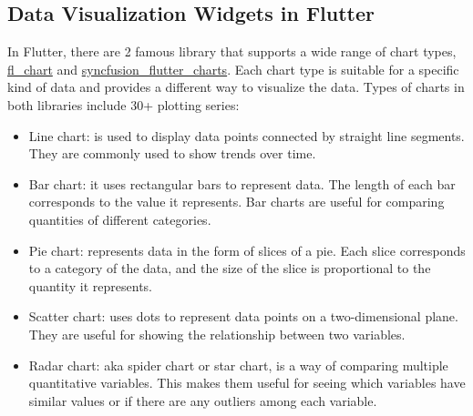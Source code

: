 \begin{multicols}{2}
      \subsection{Data Visualization Widgets in Flutter}
      In Flutter, there are 2 famous library that supports a wide range of chart types, \href{https://pub.dev/packages/fl_chart}{fl\_chart}
      and \href{https://pub.dev/packages/syncfusion_flutter_charts}{syncfusion\_flutter\_charts}. Each chart type is suitable for a
      specific kind of data and provides a different way to visualize the data. Types of charts in both libraries include 30+ plotting series:
      \begin{itemize}
            \item Line chart: is used to display data points connected by straight line segments. They are commonly used to show trends
                  over time.
            \item Bar chart: it uses rectangular bars to represent data. The length of each bar corresponds to the value it represents.
                  Bar charts are useful for comparing quantities of different categories.
            \item Pie chart: represents data in the form of slices of a pie. Each slice corresponds to a category of the data, and the
                  size of the slice is proportional to the quantity it represents.
            \item Scatter chart: uses dots to represent data points on a two-dimensional plane. They are useful for showing the
                  relationship between two variables.
            \item Radar chart: \acrshort{aka} spider chart or star chart, is a way of comparing multiple quantitative variables. This
                  makes them useful for seeing which variables have similar values or if there are any outliers among each variable.
      \end{itemize}
\end{multicols}


